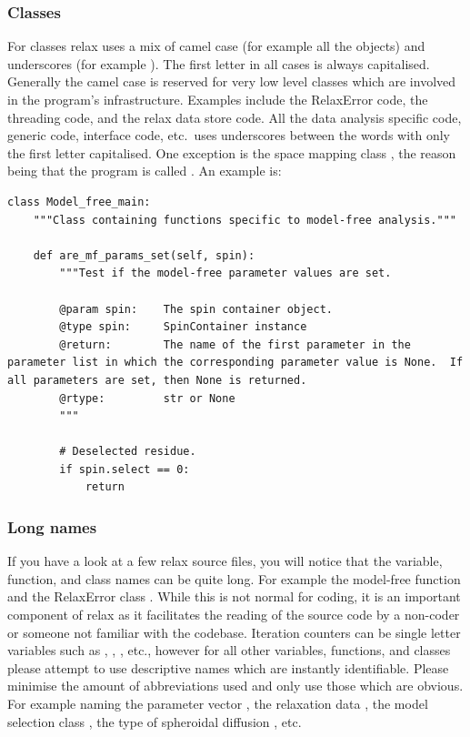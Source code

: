 \subsubsection{Classes}

For classes relax uses a mix of camel case (for example all the  objects) and underscores (for example ).
The first letter in all cases is always capitalised.
Generally the camel case is reserved for very low level classes which are involved in the program's infrastructure.
Examples include the RelaxError code, the threading code, and the relax data store code.
All the data analysis specific code, generic code, interface code, etc.\ uses underscores between the words with only the first letter capitalised.
One exception is the space mapping class , the reason being that the program is called .
An example is:

\begin{lstlisting}
class Model_free_main:
    """Class containing functions specific to model-free analysis."""

    def are_mf_params_set(self, spin):
        """Test if the model-free parameter values are set.

        @param spin:    The spin container object.
        @type spin:     SpinContainer instance
        @return:        The name of the first parameter in the parameter list in which the corresponding parameter value is None.  If all parameters are set, then None is returned.
        @rtype:         str or None
        """

        # Deselected residue.
        if spin.select == 0:
            return
\end{lstlisting}



\subsubsection{Long names}

If you have a look at a few relax source files, you will notice that the variable, function, and class names can be quite long.
For example the model-free function  and the RelaxError class .
While this is not normal for coding, it is an important component of relax as it facilitates the reading of the source code by a non-coder or someone not familiar with the codebase.
Iteration counters can be single letter variables such as , , , etc., however for all other variables, functions, and classes please attempt to use descriptive names which are instantly identifiable.
Please minimise the amount of abbreviations used and only use those which are obvious.
For example naming the parameter vector , the relaxation data , the model selection class , the type of spheroidal diffusion , etc.



